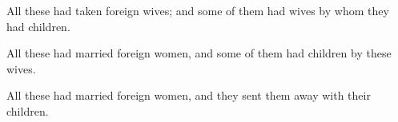 			\begin{versebox}
					\item[BHS] 
					\item[LXX] 
					\item[ASV] All these had taken foreign wives; and some of them had wives by whom they had children.
					\item[NIV] All these had married foreign women, and some of them had children by these wives.
					\item[NRSV] All these had married foreign women, and they sent them away with their children.
			\end{versebox}
